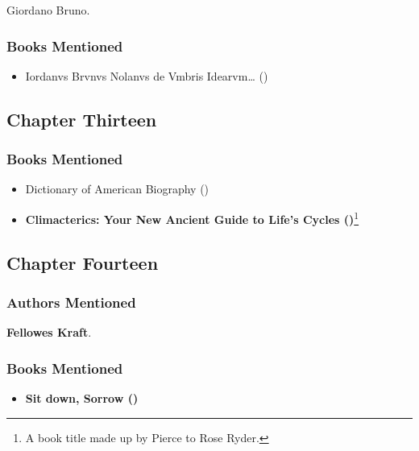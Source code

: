 \documentclass[
]{article}
\providecommand{\tightlist}{%
  \setlength{\itemsep}{0pt}\setlength{\parskip}{0pt}}
\begin{document}
Giordano Bruno.

\subsubsection{Books Mentioned}\label{books-mentioned-17}

\begin{itemize}
\tightlist
\item
  Iordanvs Brvnvs Nolanvs de Vmbris Idearvm\ldots{}
  ()
\end{itemize}

\subsection{Chapter Thirteen}\label{chapter-thirteen-1}

\subsubsection{Books Mentioned}\label{books-mentioned-18}

\begin{itemize}
\tightlist
\item
  Dictionary of American Biography
  ()
\item
  \textbf{Climacterics: Your New Ancient Guide to Life's Cycles
  ()}\footnote{A book title made up
    by Pierce to Rose Ryder.}
\end{itemize}

\subsection{Chapter Fourteen}\label{chapter-fourteen-1}

\subsubsection{Authors Mentioned}\label{authors-mentioned-18}

\textbf{Fellowes Kraft}.

\subsubsection{Books Mentioned}\label{books-mentioned-19}

\begin{itemize}
\tightlist
\item
  \textbf{Sit down, Sorrow ()}
\end{itemize}
\end{document}
